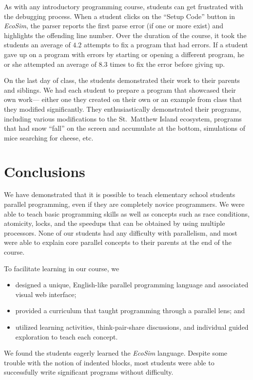 \documentclass{sig-alternate}
\newcommand{\FIXME}[1]{{\color{red}\{FIXME #1\}}}
\newcommand{\EcoSim}{\emph{EcoSim}}
\begin{document}
As with any introductory programming course, students can get frustrated with the debugging
process.  When a student clicks on the ``Setup Code'' button in \emph{EcoSim}, the parser reports
the first parse error (if one or more exist) and highlights the offending line number.  Over the
duration of the course, it took the students an average of $4.2$ attempts to fix a program that
had errors.  If a student gave up on a program with errors by starting or opening a different
program, he or she attempted an average of $8.3$ times to fix the error before giving up.


On the last day of class, the students demonstrated their work to their parents and siblings. 
We had each student to prepare a program that showcased their own work---%
either one they created on their own or an example from class that they modified significantly.
They enthusiastically demonstrated their programs,
including various modifications to the St.~Matthew Island ecosystem,
programs that had snow ``fall'' on the screen and accumulate at the bottom,
simulations of mice searching for cheese,
etc.

\section{Conclusions}
We have demonstrated that it is possible to teach elementary school students parallel programming,
even if they are completely novice programmers. 
We were able to teach basic programming skills as well as concepts such as race conditions, 
atomicity, locks, and the speedups that can be obtained by using multiple processors.
None of our students had any difficulty with parallelism, 
and most were able to explain core parallel concepts to their parents at the end of the course.

To facilitate learning in our course, we
\begin{itemize}\itemsep=0pt \topsep=0pt
\item designed a unique, English-like parallel programming language and associated visual web interface;
\item provided a curriculum that taught programming through a parallel lens; and
\item utilized learning activities, think-pair-share discussions, and individual guided exploration to teach each concept.
\end{itemize}
We found the students eagerly learned the \EcoSim{} language.
Despite some trouble with the notion of indented blocks,
most students were able to successfully write significant programs without difficulty.  
\end{document}
